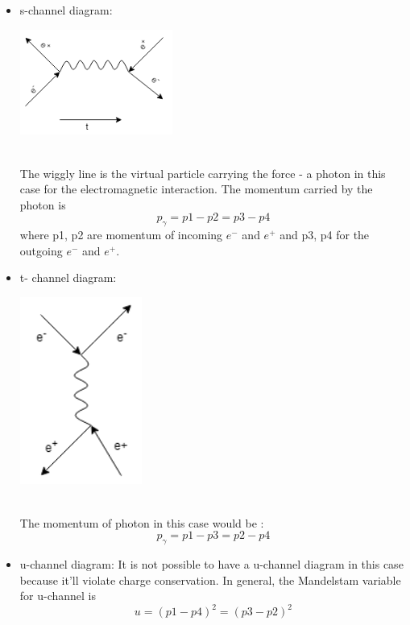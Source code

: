 \documentclass[12pt,a4paper,oneside]{book}
\begin{document}
\begin{itemize}
    \item s-channel diagram:\par 
    \begin{minipage}{\linewidth}
        \centering
        \includegraphics[width = 5cm]{s_feynman_diag.png}
        \label{fig:my_label}
    \end{minipage}
    \\ The wiggly line is the virtual particle carrying the force - a photon in this case for the electromagnetic interaction. The momentum carried by the photon is
    \begin{equation}
        p_{\gamma} = p1 -p2 = p3 -p4
    \end{equation}
    where p1, p2 are momentum of incoming $e^{-}$ and $e^{+}$ and p3, p4 for the outgoing $e^{-}$ and $e^{+}$.
    \item t- channel diagram:\par 
    \begin{minipage}{\linewidth}
        \centering
        \includegraphics[width =4cm]{t_feynman_chan.png}
        \label{fig:my_label}
    \end{minipage}
    \\ The momentum of photon in this case would be :
    \begin{equation}
        p_{\gamma} = p1 -p3 = p2 -p4
    \end{equation}
    \item u-channel diagram: It is not possible to have a u-channel diagram in this case because it'll violate charge conservation. In general, the Mandelstam variable for u-channel is 
    \begin{equation}
        u = (p1-p4)^2 = (p3-p2)^2
    \end{equation}


\end{itemize}
\end{document}
